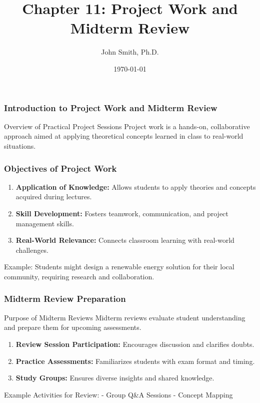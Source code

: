 \documentclass[aspectratio=169]{beamer}
\title[Project Work and Midterm Review]{Chapter 11: Project Work and Midterm Review}
\author[J. Smith]{John Smith, Ph.D.}
\institute[University Name]{
  Department of Computer Science\\
  University Name\\
  \vspace{0.3cm}
  Email: email@university.edu\\
  Website: www.university.edu
}
\date{\today}
\begin{document}
\frame{\titlepage}

\begin{frame}[fragile]
    \frametitle{Introduction to Project Work and Midterm Review}
    \begin{block}{Overview of Practical Project Sessions}
        Project work is a hands-on, collaborative approach aimed at applying theoretical concepts learned in class to real-world situations.
    \end{block}
\end{frame}

\begin{frame}[fragile]
    \frametitle{Objectives of Project Work}
    \begin{enumerate}
        \item \textbf{Application of Knowledge:} Allows students to apply theories and concepts acquired during lectures.
        \item \textbf{Skill Development:} Fosters teamwork, communication, and project management skills.
        \item \textbf{Real-World Relevance:} Connects classroom learning with real-world challenges.
    \end{enumerate}
    
    \begin{block}{Example:}
        Students might design a renewable energy solution for their local community, requiring research and collaboration.
    \end{block}
\end{frame}

\begin{frame}[fragile]
    \frametitle{Midterm Review Preparation}
    \begin{block}{Purpose of Midterm Reviews}
        Midterm reviews evaluate student understanding and prepare them for upcoming assessments.
    \end{block}

    \begin{enumerate}
        \item \textbf{Review Session Participation:} Encourages discussion and clarifies doubts.
        \item \textbf{Practice Assessments:} Familiarizes students with exam format and timing.
        \item \textbf{Study Groups:} Ensures diverse insights and shared knowledge.
    \end{enumerate}
    
    \begin{block}{Example Activities for Review:}
        - Group Q\&A Sessions
        - Concept Mapping
    \end{block}
\end{frame}
\end{document}
